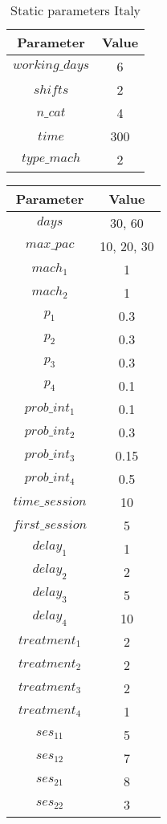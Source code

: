 \begin{table}[h!]
\centering
\begin{tabular}{|c|c|}
			\hline
			Parameter & Value\\
			\hline
			 $working\_days$ & 6\\
			 $shifts$ & 2\\
			 $n\_cat$ & 4\\
			 $time$ & 300\\
			 $type\_mach$ & 2\\
			 \hline
\end{tabular}
\caption{Static parameters Italy}\label{tbl:static_param_it}
\end{table}


\begin{table}[h!]
\centering
\begin{tabular}{|c|c|}
			\hline
			Parameter & Value\\
			\hline
			 $days$ & 30, 60\\
			 $max\_pac$ & 10, 20, 30\\
			 $mach_1$ & 1\\
			 $mach_2$ & 1\\
			 $p_1$ & 0.3\\
			 $p_2$ & 0.3\\
			 $p_3$ & 0.3\\
			 $p_4$ & 0.1\\
			 $prob\_int_1$ & 0.1\\
			 $prob\_int_2$ & 0.3\\
			 $prob\_int_3$ & 0.15\\
			 $prob\_int_4$ & 0.5\\
			 $time\_session$ & 10\\
			 $first\_session$ & 5\\
			 $delay_1$ & 1\\
			 $delay_2$ & 2\\
			 $delay_3$ & 5\\
			 $delay_4$ & 10\\
			 \hline
			 $treatment_1$ & 2 \\
			 $treatment_2$ & 2 \\
			 $treatment_3$ & 2 \\
			 $treatment_4$ & 1 \\
			 \hline
			 $ses_{11}$ & 5\\
			 $ses_{12}$ & 7\\
			 $ses_{21}$ & 8\\
			 $ses_{22}$ & 3\\

\end{tabular}
\end{table}
